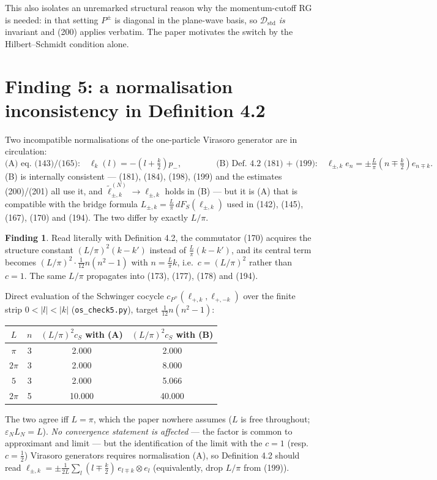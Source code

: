 \documentclass[11pt,a4paper]{article}
\theoremstyle{definition}
\newtheorem{finding}{Finding}
\newcommand{\eps}{\varepsilon}
\newcommand{\Dstd}{\mathcal{D}_{\mathrm{std}}}
\begin{document}
\noindent
This also isolates an unremarked structural reason why the momentum-cutoff RG is needed: in
that setting $P^\pm$ is diagonal in the plane-wave basis, so $\Dstd$ \emph{is} invariant and
(200) applies verbatim. The paper motivates the switch by the Hilbert--Schmidt condition alone.

\section{Finding 5: a normalisation inconsistency in Definition 4.2}

\noindent
Two incompatible normalisations of the one-particle Virasoro generator are in circulation:
\[
\text{(A) eq.\ (143)/(165):}\quad \ell_k(l)=-(l+\tfrac k2)p_-,
\qquad\qquad
\text{(B) Def.\ 4.2 (181) + (199):}\quad \ell_{\pm,k}e_n=\pm\tfrac L\pi(n\mp\tfrac k2)e_{n\mp k}.
\]
(B) is internally consistent --- (181), (184), (198), (199) and the estimates (200)/(201) all use
it, and $\tilde\ell^{(N)}_{\pm,k}\to\ell_{\pm,k}$ holds in (B) --- but it is (A) that is
compatible with the bridge formula $L_{\pm,k}=\frac L\pi\,dF_S(\ell_{\pm,k})$ used in (142),
(145), (167), (170) and (194). The two differ by exactly $L/\pi$.

\begin{finding}
Read literally with Definition 4.2, the commutator (170) acquires the structure constant
$(L/\pi)^2(k-k')$ instead of $\frac L\pi(k-k')$, and its central term becomes
$(L/\pi)^2\cdot\frac1{12}n(n^2-1)$ with $n=\frac L\pi k$, i.e.\ $c=(L/\pi)^2$ rather than $c=1$.
The same $L/\pi$ propagates into (173), (177), (178) and (194).
\end{finding}

\noindent
Direct evaluation of the Schwinger cocycle $c_{P^\mp}(\ell_{+,k},\ell_{+,-k})$ over the finite
strip $0<|l|<|k|$ (\texttt{os\_check5.py}), target $\frac1{12}n(n^2-1)$:
\begin{center}\small
\begin{tabular}{cccc}
\toprule
$L$ & $n$ & $(L/\pi)^2c_S$ with (A) & $(L/\pi)^2c_S$ with (B)\\
\midrule
$\pi$   & 3 & 2.000 & 2.000\\
$2\pi$  & 3 & 2.000 & \color{red}8.000\\
$5$     & 3 & 2.000 & \color{red}5.066\\
$2\pi$  & 5 & 10.000 & \color{red}40.000\\
\bottomrule
\end{tabular}
\end{center}
The two agree iff $L=\pi$, which the paper nowhere assumes ($L$ is free throughout;
$\eps_NL_N=L$). \emph{No convergence statement is affected} --- the factor is common to
approximant and limit --- but the identification of the limit with the $c=1$ (resp.\ $c=\frac12$)
Virasoro generators requires normalisation (A), so Definition 4.2 should read
$\ell_{\pm,k}=\pm\frac{1}{2L}\sum_l(l\mp\frac k2)\,e_{l\mp k}\otimes e_l$ (equivalently, drop
$L/\pi$ from (199)).
\end{document}
